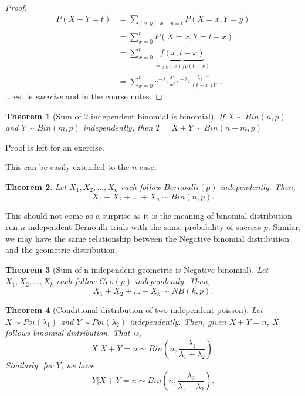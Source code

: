 \documentclass[
]{book}
\newtheorem{theorem}{Theorem}[chapter]
\theoremstyle{definition}
\theoremstyle{definition}
\theoremstyle{definition}
\theoremstyle{definition}
\theoremstyle{remark}
\begin{document}
\begin{proof}
\begin{align*}
    P(X+Y=t) &= \sum_{(x,y):x+y= t} P(X=x, Y=y) \\
    &= \sum_{x=0}^t P(X=x, Y=t-x)\\
    &=   \sum_{x=0}^t  \underbrace{f(x,t-x)}_{=f_X(x)f_Y(t-x)}\\
    & =\sum_{x=0}^t e^{-\lambda_1} \frac{\lambda_1^x}{x!}e^{-\lambda_2} \frac{\lambda_2^{t-x}}{(t-x)!}  \dots\end{align*}
\dots rest is \emph{exercise} and in the course notes.
\end{proof}

\begin{theorem}[Sum of 2 independent binomial is binomial]
If \(X \sim Bin(n, p)\) and \(Y \sim Bin(m, p)\) independently, then \(T = X + Y \sim Bin(n + m, p)\)
\end{theorem}

Proof is left for an exercise.

This can be easily extended to the \(n\)-case.

\begin{theorem}
Let \(X_1, X_2, \ldots, X_n\) each follow \(Bernoulli(p)\) independently. Then,
\[
X_1 + X_2 + \ldots + X_n \sim Bin(n,p).
\]
\end{theorem}

This should not come as a surprise as it is the meaning of binomial distribution -- run \(n\) independent Bernoulli trials with the same probability of success \(p\). Similar, we may have the same relationship between the Negative binomial distribution and the geometric distribution.

\begin{theorem}[Sum of n independent geometric is Negative binomial]
Let \(X_1, X_2, \ldots, X_k\) each follow \(Geo(p)\) independently. Then,
\[
X_1 + X_2 + \ldots + X_k \sim NB(k,p).
\]
\end{theorem}

\begin{theorem}[Conditional distribution of two independent poisson]
Let \(X \sim Poi(\lambda_1)\) and \(Y \sim Poi(\lambda_2)\) independently. Then, given \(X + Y = n\), \(X\) follows binomial distribution. That is,
\[
X|X+Y = n \sim Bin\left(n, \frac{\lambda_1}{\lambda_1 + \lambda_2}\right).
\]
Similarly, for \(Y\), we have
\[
Y|X+Y = n \sim Bin\left(n, \frac{\lambda_2}{\lambda_1 + \lambda_2}\right).
\]
\end{theorem}
\end{document}
